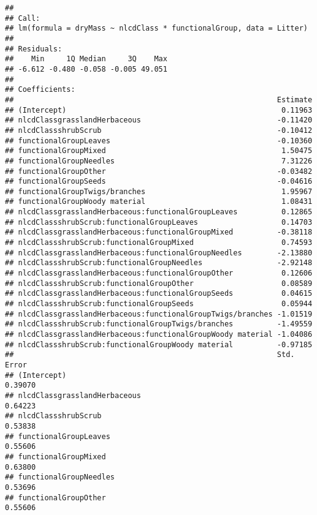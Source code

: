 \documentclass[]{article}
\begin{document}
\begin{verbatim}
## 
## Call:
## lm(formula = dryMass ~ nlcdClass * functionalGroup, data = Litter)
## 
## Residuals:
##    Min     1Q Median     3Q    Max 
## -6.612 -0.480 -0.058 -0.005 49.051 
## 
## Coefficients:
##                                                            Estimate
## (Intercept)                                                 0.11963
## nlcdClassgrasslandHerbaceous                               -0.11420
## nlcdClassshrubScrub                                        -0.10412
## functionalGroupLeaves                                      -0.10360
## functionalGroupMixed                                        1.50475
## functionalGroupNeedles                                      7.31226
## functionalGroupOther                                       -0.03482
## functionalGroupSeeds                                       -0.04616
## functionalGroupTwigs/branches                               1.95967
## functionalGroupWoody material                               1.08431
## nlcdClassgrasslandHerbaceous:functionalGroupLeaves          0.12865
## nlcdClassshrubScrub:functionalGroupLeaves                   0.14703
## nlcdClassgrasslandHerbaceous:functionalGroupMixed          -0.38118
## nlcdClassshrubScrub:functionalGroupMixed                    0.74593
## nlcdClassgrasslandHerbaceous:functionalGroupNeedles        -2.13880
## nlcdClassshrubScrub:functionalGroupNeedles                 -2.92148
## nlcdClassgrasslandHerbaceous:functionalGroupOther           0.12606
## nlcdClassshrubScrub:functionalGroupOther                    0.08589
## nlcdClassgrasslandHerbaceous:functionalGroupSeeds           0.04615
## nlcdClassshrubScrub:functionalGroupSeeds                    0.05944
## nlcdClassgrasslandHerbaceous:functionalGroupTwigs/branches -1.01519
## nlcdClassshrubScrub:functionalGroupTwigs/branches          -1.49559
## nlcdClassgrasslandHerbaceous:functionalGroupWoody material -1.04086
## nlcdClassshrubScrub:functionalGroupWoody material          -0.97185
##                                                            Std. Error
## (Intercept)                                                   0.39070
## nlcdClassgrasslandHerbaceous                                  0.64223
## nlcdClassshrubScrub                                           0.53838
## functionalGroupLeaves                                         0.55606
## functionalGroupMixed                                          0.63800
## functionalGroupNeedles                                        0.53696
## functionalGroupOther                                          0.55606

\end{verbatim}
\end{document}
